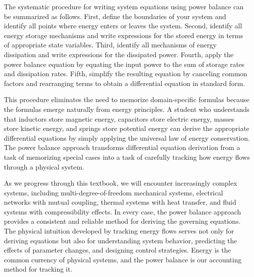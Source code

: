 The systematic procedure for writing system equations using power balance can be summarized as follows. First, define the boundaries of your system and identify all points where energy enters or leaves the system. Second, identify all energy storage mechanisms and write expressions for the stored energy in terms of appropriate state variables. Third, identify all mechanisms of energy dissipation and write expressions for the dissipated power. Fourth, apply the power balance equation by equating the input power to the sum of storage rates and dissipation rates. Fifth, simplify the resulting equation by canceling common factors and rearranging terms to obtain a differential equation in standard form.

This procedure eliminates the need to memorize domain-specific formulas because the formulas emerge naturally from energy principles. A student who understands that inductors store magnetic energy, capacitors store electric energy, masses store kinetic energy, and springs store potential energy can derive the appropriate differential equations by simply applying the universal law of energy conservation. The power balance approach transforms differential equation derivation from a task of memorizing special cases into a task of carefully tracking how energy flows through a physical system.

As we progress through this textbook, we will encounter increasingly complex systems, including multi-degree-of-freedom mechanical systems, electrical networks with mutual coupling, thermal systems with heat transfer, and fluid systems with compressibility effects. In every case, the power balance approach provides a consistent and reliable method for deriving the governing equations. The physical intuition developed by tracking energy flows serves not only for deriving equations but also for understanding system behavior, predicting the effects of parameter changes, and designing control strategies. Energy is the common currency of physical systems, and the power balance is our accounting method for tracking it.

